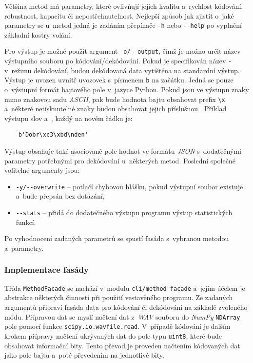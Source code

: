 Většina metod má parametry, které ovlivňují jejich kvalitu a~rychlost kódování,
robustnost, kapacitu či nepostřehnutelnost. Nejlepší způsob jak zjistit o~jaké
parametry se u~metod jedná je zadáním přepínače \verb|-h| nebo \verb|--help| po
vyplnění základní kostry volání.

Pro výstup je možné použít argument \verb|-o/--output|, čímž je možno určit
název výstupního souboru po kódování/dekódování. Pokud je specifikován název
\texttt{-} v~režimu dekódování, budou dekódovaná data vytištěna na standardní
výstup. Výstup je uvozen uvnitř uvozovek s~písmenem \texttt{b} na začátku.
Jedná se pouze o~výstupní formát bajtového pole v~jazyce Python. Pokud jsou ve
výstupu znaky mimo znakovou sadu \textit{ASCII}, pak bude hodnota bajtu
obsahovat prefix \verb|\x| a~některé netisknutelné znaky budou obsahovat jejich
příslušnou . Příklad výstupu slov  a~,
každý na novém řádku je:

\begin{verbatim}
    b'Dobr\xc3\xbd\nden'
\end{verbatim}

\noindent Výstup obsahuje také asociované pole hodnot ve formátu \textit{JSON}
s~dodatečnými parametry potřebnými pro dekódování u~některých metod. Poslední
společné volitelné argumenty jsou:

\begin{itemize}
    \item \verb|-y/--overwrite| -- potlačí chybovou hlášku, pokud výstupní
        soubor existuje a~bude přepsán bez dotázání,
    \item \verb|--stats| -- přidá do dodatečného výstupu programu výstup
        statistických funkcí.
\end{itemize}

\noindent Po vyhodnocení zadaných parametrů se spustí fasáda s~vybranou metodou
a~parametry.

\subsubsection*{Implementace fasády}
\label{ssub:facade-implementation}

Třída \texttt{MethodFacade} se nachází v~modulu \texttt{cli/method\_facade}
a~jejím účelem je abstrakce některých činností při použití vestavěného
programu. Ze zadaných argumentů připraví fasáda data pro kódování či dekódování
na základě zvoleného módu. Přípravou dat se myslí načtení dat z~\textit{WAV}
souboru do \textit{NumPy} \texttt{NDArray} pole pomocí funkce
\texttt{scipy.io.wavfile.read}. V~případě kódování je dalším krokem přípravy
načtení ukrývaných dat do pole typu \texttt{uint8}, které bude obsahovat
informační bity. Tento převod je proveden načtením kódovaných dat jako pole
bajtů a~poté převedením na jednotlivé bity.

